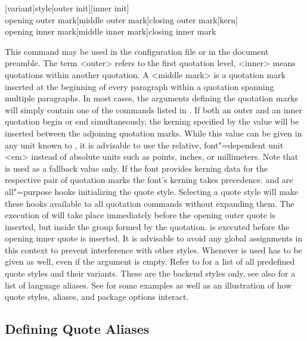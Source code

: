 \documentclass{ltxdockit}[2010/09/26]
\begin{document}
\begin{ltxsyntax}

[variant]{style}[outer init][inner init]\\
{opening outer mark}[middle outer mark]{closing outer mark}[kern]\\
{opening inner mark}[middle inner mark]{closing inner mark}

This command may be used in the configuration file or in the document preamble. The term <outer> refers to the first quotation level, <inner> means quotations within another quotation. A <middle mark> is a quotation mark inserted at the beginning of every paragraph within a quotation spanning multiple paragraphs. In most cases, the arguments defining the quotation marks will simply contain one of the commands listed in . If both an outer and an inner quotation begin or end simultaneously, the kerning specified by the value  will be inserted between the adjoining quotation marks. While this value can be given in any unit known to \tex, it is advisable to use the relative, font"=dependent unit <em> instead of absolute units such as points, inches, or millimeters. Note that  is used as a fallback value only. If the font provides kerning data for the respective pair of quotation marks the font's kerning takes precedence.  and  are all"=purpose hooks initializing the quote style. Selecting a quote style will make these hooks available to all quotation commands without expanding them. The execution of  will take place immediately before the opening outer quote is inserted, but inside the group formed by the quotation.  is executed before the opening inner quote is inserted. It is advisable to avoid any global assignments in this context to prevent interference with other styles. Whenever  is used  has to be given as well, even if the argument is empty. Refer to  for a list of all predefined quote styles and their variants. These are the backend styles only, see also  for a list of language aliases. See  for some examples as well as an illustration of how quote styles, aliases, and package options interact.

\end{ltxsyntax}

\subsection{Defining Quote Aliases}
\label{cfg:als}
\end{document}
